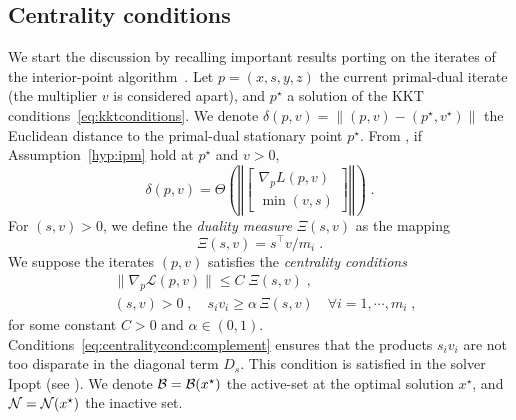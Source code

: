 \subsection{Centrality conditions}
We start the discussion by recalling important results porting
on the iterates of the interior-point algorithm~\cite{wright2001effects}.
Let $p = (x, s, y, z)$ the current primal-dual iterate (the multiplier $v$ is considered apart),
and $p^\star$ a solution of the KKT conditions~\eqref{eq:kktconditions}.
We denote $\delta(p, v) = \| (p, v) - (p^\star, v^\star) \|$ the Euclidean distance to the
primal-dual stationary point $p^\star$.
From \cite[Theorem 2.2]{wright2001effects}, if Assumption~\ref{hyp:ipm}
hold at $p^\star$ and $v > 0$,
\begin{equation}
  \delta(p, v) = \Theta\left( \left\Vert \begin{bmatrix}
      \nabla_p L(p, v) \\ \min(v, s)
  \end{bmatrix}
  \right\Vert \right) \; .
\end{equation}
For $(s, v) > 0$, we define the \emph{duality measure} $\Xi(s, v)$ as the mapping
\begin{equation}
  \Xi(s, v) = s^\top v / m_i \; .
\end{equation}
We suppose the iterates $(p, v)$ satisfies the \emph{centrality conditions}
\begin{subequations}
  \label{eq:centralitycond}
  \begin{align}
    & \| \nabla_p \mathcal{L}(p, v) \| \leq C \; \Xi(s, v) \;,  \\
    \label{eq:centralitycond:complement}
    & (s, v) > 0 \;,\quad s_i v_i \geq \alpha \, \Xi(s, v) \quad \forall i =1, \cdots, m_i \; ,
  \end{align}
\end{subequations}
for some constant $C > 0$ and $\alpha \in (0, 1)$.
Conditions~\eqref{eq:centralitycond:complement} ensures that the products
$s_i v_i$ are not too disparate in the diagonal term $D_s$.
This condition is satisfied in the solver Ipopt (see \cite[Equation (16)]{wachter2006implementation}).
We denote $\mathcal{B} = \mathcal{B}(x^\star)$ the active-set at the optimal solution $x^\star$,
and $\mathcal{N} = \mathcal{N}(x^\star)$ the inactive set.

